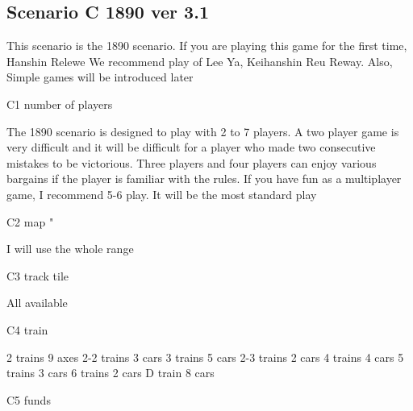 \documentclass{article}
\begin{document}
\begin{CJK}{UTF8}{min}










\section{Scenario C 1890 ver 3.1}

This scenario is the 1890 scenario.
If you are playing this game for the first time, Hanshin Relewe
We recommend play of Lee Ya, Keihanshin Reu Reway. Also,
Simple games will be introduced later

C1 number of players

The 1890 scenario is designed to play with 2 to 7 players. A two player game is very difficult and it will be difficult for a player who made two consecutive mistakes to be victorious. Three players and four players can enjoy various bargains if the player is familiar with the rules. If you have fun as a multiplayer game, I recommend 5-6 play. It will be the most standard play

C2 map "

I will use the whole range

C3 track tile

All available

C4 train

2 trains 9 axes
2-2 trains 3 cars
3 trains 5 cars
2-3 trains 2 cars
4 trains 4 cars
5 trains 3 cars
6 trains 2 cars
D train 8 cars

C5 funds


\end{CJK}
\end{document}
